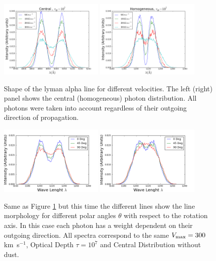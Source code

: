 \documentclass[usenatbib]{mn2e}
\newcommand{\kms}{\,km~s$^{-1}$}
\begin{document}
\begin{figure}
  \includegraphics[width=0.45\textwidth]{7tDifSpeedsZ.png}
  \includegraphics[width=0.45\textwidth]{7tHOMDifSpeeds1.png}
\caption{Shape of the lyman alpha line for
    different velocities. The left (right) panel shows the central
    (homogeneous) photon distribution. All photons were taken into
    account regardless of their outgoing direction of propagation.
  \label{fig:differentvelocities}}
\end{figure}

\begin{figure}
\includegraphics[width=0.45\textwidth]{Observers7t.png}
\includegraphics[width=0.45\textwidth]{Observers7tHOM.png}
\caption{Same as Figure \ref{fig:differentvelocities} but this time
  the different lines show the line morphology for different polar angles
  $\theta$ with respect to the rotation axis. In this case each photon
  has a weight dependent on their outgoing direction. All spectra correspond
  to the same $V_{\rm max}=300$\kms, Optical   Depth $\tau=10^{7}$ and
  Central Distribution without dust.
  \label{fig:differentobservers}}  

\end{figure}
\end{document}
